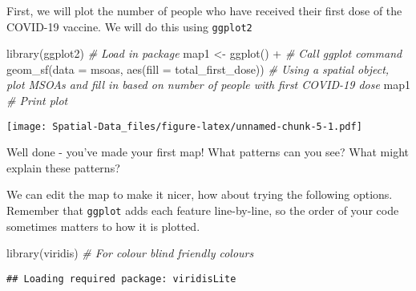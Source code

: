\documentclass[
]{book}
\newenvironment{Shaded}{\begin{snugshade}}{\end{snugshade}}
\newcommand{\AttributeTok}[1]{\textcolor[rgb]{0.77,0.63,0.00}{#1}}
\newcommand{\CommentTok}[1]{\textcolor[rgb]{0.56,0.35,0.01}{\textit{#1}}}
\newcommand{\FunctionTok}[1]{\textcolor[rgb]{0.00,0.00,0.00}{#1}}
\newcommand{\NormalTok}[1]{#1}
\newcommand{\OtherTok}[1]{\textcolor[rgb]{0.56,0.35,0.01}{#1}}
\newcommand{\SpecialCharTok}[1]{\textcolor[rgb]{0.00,0.00,0.00}{#1}}
\begin{document}
First, we will plot the number of people who have received their first dose of the COVID-19 vaccine. We will do this using \texttt{ggplot2}

\begin{Shaded}
\begin{Highlighting}[]
\FunctionTok{library}\NormalTok{(ggplot2) }\CommentTok{\# Load in package}
\NormalTok{map1 }\OtherTok{\textless{}{-}} \FunctionTok{ggplot}\NormalTok{() }\SpecialCharTok{+} \CommentTok{\# Call ggplot command}
          \FunctionTok{geom\_sf}\NormalTok{(}\AttributeTok{data =}\NormalTok{ msoas, }\FunctionTok{aes}\NormalTok{(}\AttributeTok{fill =}\NormalTok{ total\_first\_dose)) }\CommentTok{\# Using a spatial object, plot MSOAs and fill in based on number of people with first COVID{-}19 dose}
\NormalTok{map1 }\CommentTok{\# Print plot}
\end{Highlighting}
\end{Shaded}

\texttt{[image: Spatial-Data\_files/figure-latex/unnamed-chunk-5-1.pdf]}

Well done - you've made your first map! What patterns can you see? What might explain these patterns?

We can edit the map to make it nicer, how about trying the following options. Remember that \texttt{ggplot} adds each feature line-by-line, so the order of your code sometimes matters to how it is plotted.

\begin{Shaded}
\begin{Highlighting}[]
\FunctionTok{library}\NormalTok{(viridis) }\CommentTok{\# For colour blind friendly colours}
\end{Highlighting}
\end{Shaded}

\begin{verbatim}
## Loading required package: viridisLite
\end{verbatim}
\end{document}
